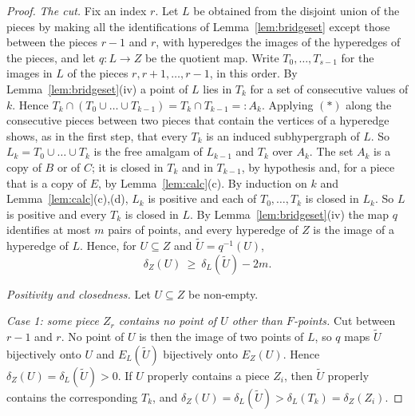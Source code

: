 \begin{proof}
\emph{The cut.} Fix an index $r$. Let $L$ be obtained from the disjoint union
of the pieces by making all the identifications of Lemma~\ref{lem:bridgeset}
except those between the pieces $r-1$ and $r$, with hyperedges the images of
the hyperedges of the pieces, and let $q\colon L\to Z$ be the quotient map.
Write $T_0,\dots,T_{s-1}$ for the images in $L$ of the pieces
$r,r+1,\dots,r-1$, in this order. By Lemma~\ref{lem:bridgeset}(iv) a point of
$L$ lies in $T_k$ for a set of consecutive values of $k$. Hence
$T_k\cap(T_0\cup\dots\cup T_{k-1})=T_k\cap T_{k-1}=:A_k$. Applying $(\ast)$ along
the consecutive pieces between two pieces that contain the vertices of a
hyperedge shows, as in the first step, that every $T_k$ is an induced
subhypergraph of $L$. So $L_k=T_0\cup\dots\cup T_k$ is the free amalgam of
$L_{k-1}$ and $T_k$ over $A_k$. The set $A_k$ is a copy of $B$ or of $C$; it is closed in $T_k$ and in
$T_{k-1}$, by hypothesis and, for a piece that is a copy of $E$, by
Lemma~\ref{lem:calc}(c). By induction on $k$ and Lemma~\ref{lem:calc}(c),(d),
$L_k$ is positive and each of $T_0,\dots,T_k$ is closed in $L_k$. So $L$ is
positive and every $T_k$ is closed in $L$. By Lemma~\ref{lem:bridgeset}(iv) the
map $q$ identifies at most $m$ pairs of points, and every hyperedge of $Z$ is
the image of a hyperedge of $L$. Hence, for $U\subseteq Z$ and $\widetilde U=q^{-1}(U)$,
\begin{equation}\label{eq:cutloss}
 \delta_Z(U)\ \ge\ \delta_L(\widetilde U)-2m .
\end{equation}

\emph{Positivity and closedness.} Let $U\subseteq Z$ be non-empty.

\emph{Case 1: some piece $Z_r$ contains no point of $U$ other than
$F$-points.} Cut between $r-1$ and $r$. No point of $U$ is then the image of
two points of $L$, so $q$ maps $\widetilde U$ bijectively onto $U$ and
$E_L(\widetilde U)$ bijectively onto $E_Z(U)$. Hence
$\delta_Z(U)=\delta_L(\widetilde U)>0$. If $U$ properly contains a piece $Z_i$,
then $\widetilde U$ properly contains the corresponding $T_k$, and
$\delta_Z(U)=\delta_L(\widetilde U)>\delta_L(T_k)=\delta_Z(Z_i)$.


\end{proof}
